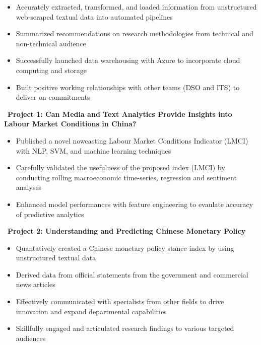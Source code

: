 \documentclass[12pt,a4paper,roman]{moderncv}        %
\begin{document}
\begin{itemize}
    \item Accurately extracted, transformed, and loaded information from unstructured web-scraped textual data into automated pipelines
    \item Summarized recommendations on research methodologies from technical and non-technical audience 
    \item Successfully launched data warehousing with Azure to incorporate cloud computing and storage 
    \item Built positive working relationships with other teams (DSO and ITS) to deliver on commitments
\end{itemize}
\bigskip
\faBook \, \textbf{Project 1: Can Media and Text Analytics Provide Insights into Labour Market Conditions in China?}
\begin{itemize}
    \item Published a novel nowcasting Labour Market Conditions Indicator (LMCI) with NLP, SVM, and machine learning techniques 
    \item Carefully validated the usefulness of the proposed index (LMCI) by conducting rolling macroeconomic time-series, regression and sentiment analyses
    \item Enhanced model performances with feature engineering to evaulate accuracy of predictive analytics
\end{itemize}
\bigskip
\faBook \, \textbf{Project 2: Understanding and Predicting Chinese Monetary Policy}
\begin{itemize}
    \item Quantatively created a Chinese monetary policy stance index by using unstructured textual data 
    \item Derived data from official statements from the government and commercial news articles
    \item Effectively communicated with specialists from other fields to drive innovation and expand departmental capabilities
    \item Skillfully engaged and articulated research findings to various targeted audiences 
\end{itemize}



\end{document}
